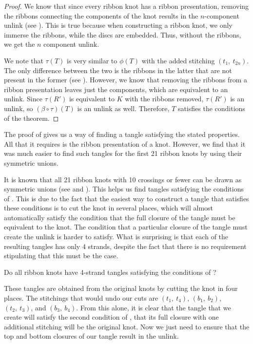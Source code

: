 \begin{paper}
\begin{proof}
We know that since every ribbon knot has a ribbon presentation, removing the
ribbons connecting the components of the knot results in the $n$-component
unlink (see \figPresentation).
This is true because when constructing a ribbon knot, we only immerse the
ribbons, while the discs are embedded.
Thus, without the ribbons, we get the $n$ component unlink.

We note that $\tau(T)$ is very similar to $\phi(T)$ with the added stitching
$(t_1,~t_{2n})$.
The only difference between the two is the ribbons in the latter that are not
present in the former (see \figFinal).
However, we know that removing the ribbons from a ribbon presentation leaves
just the components, which are equivalent to an unlink.
Since $\tau(R')$ is equivalent to $K$ with the ribbons removed, $\tau(R')$ is an
unlink, so $(\beta\circ\tau)(T)$ is an unlink as well.
Therefore, $T$ satisfies the conditions of the theorem.
\end{proof}


The proof of \thmRibbon gives us a way of finding a tangle satisfying the stated
properties.
All that it requires is the ribbon presentation of a knot.
However, we find that it was much easier to find such tangles for the first 21
ribbon knots by using their symmetric unions.

It is known that all 21 ribbon knots with 10 crossings or fewer can be drawn as
symmetric unions (see \cite{many} and \cite{one}).
This helps us find tangles satisfying the conditions of \thmRibbon.
This is due to the fact that the easiest way to construct a tangle that
satisfies these conditions is to cut the knot in several places, which will
almost automatically satisfy the condition that the full closure of the tangle
must be equivalent to the knot.
The condition that a particular closure of the tangle must create the unlink is
harder to satisfy.
What is surprising is that each of the resulting tangles has only 4 strands,
despite the fact that there is no requirement stipulating that this must be the
case.

{Do all ribbon knots have 4-strand tangles satisfying the conditions of
\thmRibbon?}

These tangles are obtained from the original knots by cutting the knot in four
places.
The stitchings that would undo our cuts are $(t_1,~t_4)$, $(b_1,~b_2)$,
$(t_2,~t_3)$, and $(b_3,~b_4)$.
From this alone, it is clear that the tangle that we create will satisfy the
second condition of \thmRibbon, that its full closure with one additional
stitching will be the original knot.
Now we just need to ensure that the top and bottom closures of our tangle
result in the unlink.


\end{paper}
